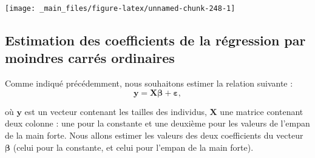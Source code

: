 \documentclass[
  11pt,
]{book}
\numberwithin{equation}{section}
\numberwithin{countremarque}{section}
\begin{document}
\begin{center}\texttt{[image: \_main\_files/figure-latex/unnamed-chunk-248-1]} \end{center}

\hypertarget{estimation-des-coefficients-de-la-ruxe9gression-par-moindres-carruxe9s-ordinaires}{%
\subsection{Estimation des coefficients de la régression par moindres carrés ordinaires}\label{estimation-des-coefficients-de-la-ruxe9gression-par-moindres-carruxe9s-ordinaires}}

Comme indiqué précédemment, nous souhaitons estimer la relation suivante : \[\boldsymbol y = \boldsymbol X \boldsymbol \beta + \boldsymbol \varepsilon,\]

où \(\boldsymbol y\) est un vecteur contenant les tailles des individus, \(\boldsymbol X\) une matrice contenant deux colonne : une pour la constante et une deuxième pour les valeurs de l'empan de la main forte. Nous allons estimer les valeurs des deux coefficients du vecteur \(\boldsymbol \beta\) (celui pour la constante, et celui pour l'empan de la main forte).
\end{document}
